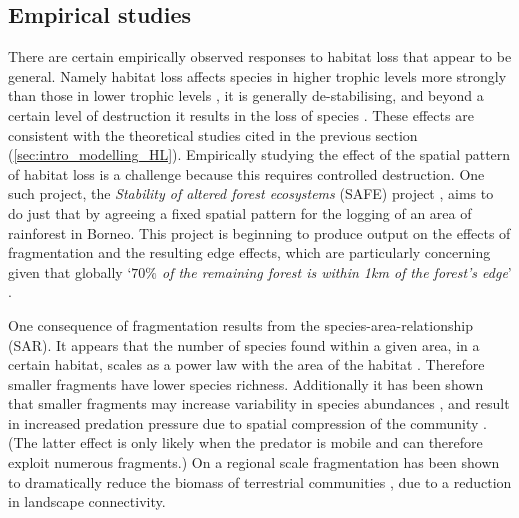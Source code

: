 
\subsection{Empirical studies}
\label{sec:intro_empirical_HL}

There are certain empirically observed responses to habitat loss that appear to be general. Namely habitat loss affects species in higher trophic levels more strongly than those in lower trophic levels \cite{duffy2003biodiversity,raffaelli2004extinction}, it is generally de-stabilising, and beyond a certain level of destruction it results in the loss of species \cite{gonzalez2011disentangled}. These effects are consistent with the theoretical studies cited in the previous section (\ref{sec:intro_modelling_HL}). Empirically studying the effect of the spatial pattern of habitat loss is a challenge because this requires controlled destruction. One such project, the \emph{Stability of altered forest ecosystems} (SAFE) project \cite{ewers2011large}, aims to do just that by agreeing a fixed spatial pattern for the logging of an area of rainforest in Borneo. This project is beginning to produce output on the effects of fragmentation and the resulting edge effects, which are particularly concerning given that globally `\emph{$70\%$ of the remaining forest is within 1km of the forest's edge}' \cite{haddad2015habitat}. 

One consequence of fragmentation results from the species-area-relationship (SAR). It appears that the number of species found within a given area, in a certain habitat, scales as a power law with the area of the habitat \cite{rosenzweig1995species}. Therefore smaller fragments have lower species richness. Additionally it has been shown that smaller fragments may increase variability	in species abundances \cite{wang2014ecosystem,ewers2006continuous}, and result in increased predation pressure due to spatial compression of the community \cite{gonzalez2011disentangled}. (The latter effect is only likely when the predator is mobile and can therefore exploit numerous fragments.) On a regional scale fragmentation has been shown to dramatically reduce the biomass of terrestrial communities \cite{haddad2015habitat}, due to a reduction in landscape connectivity.

